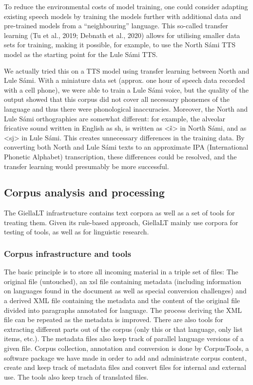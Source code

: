 \documentclass[free]{flammie}
\begin{document}
To reduce the environmental costs of model training, one could consider adapting existing speech models by training the models further with additional data and pre-trained
models from a “neighbouring” language. This so-called transfer learning (Tu et al., 2019;
Debnath et al., 2020) allows for utilising smaller data sets for training, making it possible,
for example, to use the North Sámi TTS model as the starting point for the Lule Sámi TTS.

We actually tried this on a TTS model using transfer learning between North and Lule
Sámi. With a miniature data set (approx. one hour of speech data recorded with a cell
phone), we were able to train a Lule Sámi voice, but the quality of the output showed that
this corpus did not cover all necessary phonemes of the language and thus there were phonological inaccuracies. Moreover, the North and Lule Sámi orthographies are somewhat
different: for example, the alveolar fricative sound written in English as sh, is written as
<š> in North Sámi, and as <sj> in Lule Sámi. This creates unnecessary differences in the
training data. By converting both North and Lule Sámi texts to an approximate IPA (International Phonetic Alphabet) transcription, these differences could be resolved, and the
transfer learning would presumably be more successful.

\subsection{Corpus analysis and processing}

The GiellaLT infrastructure contains text corpora as well as a set of tools for treating them.
Given its rule-based approach, GiellaLT mainly use corpora for testing of tools, as well as
for linguistic research.

\subsubsection{Corpus infrastructure and tools}

The basic principle is to store all incoming material in a triple set of files: The original file
(untouched), an xsl file containing metadata (including information on languages found in
the document as well as special conversion challenges) and a derived XML file containing
the metadata and the content of the original file divided into paragraphs annotated for language. The process deriving the XML file can be repeated as the metadata is improved.
There are also tools for extracting different parts out of the corpus (only this or that
language, only list items, etc.). The metadata files also keep track of parallel language versions of a given file. Corpus collection, annotation and conversion is done by CorpusTools,
a software package we have made in order to add and administrate corpus content, create
and keep track of metadata files and convert files for internal and external use. The tools
also keep trach of translated files.
\end{document}
